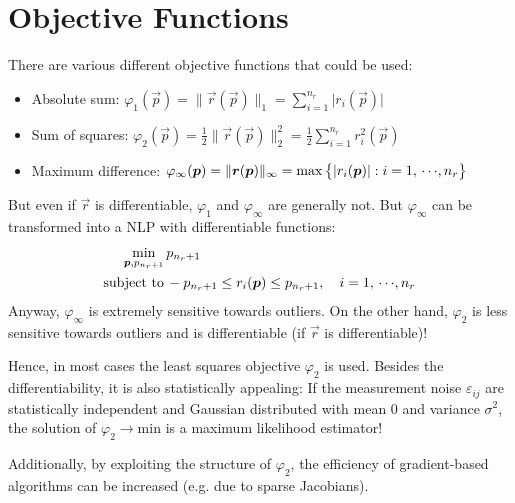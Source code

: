 	\section{Objective Functions}
		There are various different objective functions that could be used:
		\begin{itemize}
			\item Absolute sum: \tabto{4cm} \( \varphi_1(\vec{p}) = \lVert \vec{r}(\vec{p}) \rVert_1 = \sum_{i = 1}^{n_r} \lvert r_i(\vec{p}) \rvert \)
			\item Sum of squares: \tabto{4cm} \( \varphi_2(\vec{p}) = \frac{1}{2} \lVert \vec{r}(\vec{p}) \rVert_2^2 = \frac{1}{2} \sum_{i = 1}^{n_r} r_i^2(\vec{p}) \)
			\item Maximum difference: \tabto{4cm} \( \varphi_\infty(\bm{p}) = \lVert \bm{r}(\bm{p}) \rVert_\infty = \max\big\{ \lvert r_i(\bm{p}) \rvert : i = 1,\,\cdots\!,n_r \big\} \)
		\end{itemize}
		But even if \(\vec{r}\) is differentiable, \(\varphi_1\) and \(\varphi_\infty\) are generally not. But \(\varphi_\infty\) can be transformed into a NLP with differentiable functions:
		\begin{align*}
			\min_{\bm{p}, p_{n_r + 1}} &\, p_{n_r + 1} \\
			\mathrm{subject~to} &\,
				-p_{n_r + 1} \leq r_i(\bm{p}) \leq p_{n_r + 1},\quad i = 1,\,\cdots\!,n_r
		\end{align*}
		Anyway, \(\varphi_\infty\) is extremely sensitive towards outliers. On the other hand, \(\varphi_2\) is less sensitive towards outliers and is differentiable (if \(\vec{r}\) is differentiable)!

		Hence, in most cases the least squares objective \(\varphi_2\) is used. Besides the differentiability, it is also statistically appealing: If the measurement noise \(\varepsilon_{ij}\) are statistically independent and Gaussian distributed with mean \(0\) and variance \(\sigma^2\), the solution of \( \varphi_2 \to \mathrm{min} \) is a maximum likelihood estimator!

		Additionally, by exploiting the structure of \(\varphi_2\), the efficiency of gradient-based algorithms can be increased (e.g. due to sparse Jacobians).


